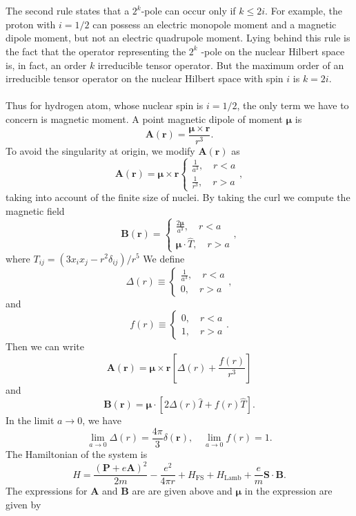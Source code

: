 \\ \\
The second rule states that a $2^k$-pole can occur only if $k \leq 2i$. For example, the proton with $i = {1}/{2}$ can possess an electric monopole moment and a magnetic dipole moment, but not an electric quadrupole moment. Lying behind this rule is the fact that the operator representing the $2^k$ -pole on the nuclear Hilbert space is, in fact, an order $k$ irreducible tensor operator. But the maximum order of an irreducible tensor operator on the nuclear Hilbert space with
spin $i$ is $k = 2i$.
\\ \\
Thus for hydrogen atom, whose nuclear spin is $i = {1}/{2}$, the only term we have to concern is magnetic moment. A point magnetic dipole of moment $\bm{\mu}$ is
\[\bm{A}(\bm{r}) = \frac{\bm{\mu}\times\bm{r}}{r^3}.\]
To avoid the singularity at origin, we modify $\bm{A}(\bm{r})$ as
\[\bm{A}(\bm{r}) = \bm{\mu}\times\bm{r} \begin{cases} \frac{1}{a^3} , \quad r < a\\ \frac{1}{r^3} , \quad r > a\end{cases} ,\]
taking into account of the finite size of nuclei. 
By taking the curl we compute the magnetic field
\[\bm{B}(\bm{r}) =  \begin{cases} \frac{2\bm{\mu}}{a^3} , \quad r < a\\ \bm{\mu}\cdot\hat{T} , \quad r > a\end{cases} ,\]
where $T_{ij} = (3x_ix_j-r^2\delta_{ij})/{r^5}$
We define
\[\Delta(r) \equiv \begin{cases} \frac{1}{a^3} , \quad r < a\\ 0 , \quad r > a\end{cases},\]
and
\[f(r) \equiv \begin{cases} 0 , \quad r < a\\ 1 , \quad r > a\end{cases}.\]
Then we can write
\[\bm{A}(\bm{r}) = \bm{\mu}\times\bm{r} \left [\Delta(r) + \frac{f(r)}{r^3}\right ] \]
and
\[\bm{B}(\bm{r}) = \bm{\mu}\cdot \left [2\Delta(r)\hat{I} + f(r)\hat{T}\right ] .\]
In the limit $a \to 0$, we have
\[\lim_{a \to 0} \Delta(r) = \frac{4\pi}{3}\delta(\bm{r}) , \quad \lim_{a \to 0} f(r) = 1.\]
The Hamiltonian of the system is
\[H = \frac{(\bm{P}+e\bm{A})^2}{2m} - \frac{e^2}{4\pi r} + H_{\mathrm{FS}} + H_{\mathrm{Lamb}} + \frac{e}{m}\bm{S}\cdot\bm{B}.\]
The expressions  for $\bm{A}$ and $\bm{B}$ are are given above and $\bm{\mu}$ in the expression are given by
